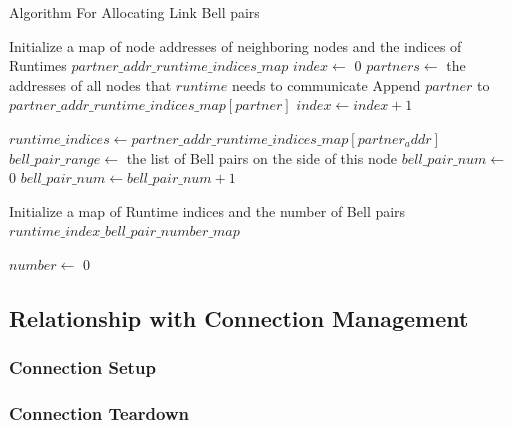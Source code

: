 \begin{algorithm}[H]  
  \caption{Algorithm For Allocating Link Bell pairs}                 
  \begin{algorithmic}[1]
    \State Initialize a map of node addresses of neighboring nodes and the indices of Runtimes $partner\_addr\_runtime\_indices\_map$
    \State $index \gets$ 0
      \State $partners \gets$ the addresses of all nodes that $runtime$ needs to communicate
        \State Append $partner$ to $partner\_addr\_runtime\_indices\_map[partner]$
      \EndFor
      \State $index \gets index + 1$
    \EndFor

      \State $runtime\_indices \gets partner\_addr\_runtime\_indices\_map[partner_addr]$
      \State $bell\_pair\_range \gets$ the list of Bell pairs on the side of this node
      \State $bell\_pair\_num \gets$ 0
        \State $bell\_pair\_num \gets bell\_pair\_num + 1$
      \EndFor

      \State  Initialize a map of Runtime indices and the number of Bell pairs $runtime\_index\_bell\_pair\_number\_map$
      \State 

    \EndFor
    \State $number \gets$ 0

  \end{algorithmic}
\end{algorithm}


\subsection{Relationship with Connection Management}
\subsubsection{Connection Setup}
\subsubsection{Connection Teardown}


